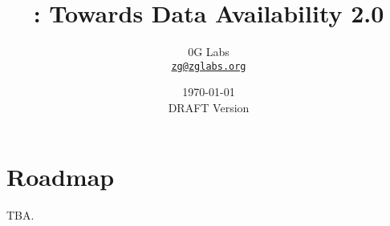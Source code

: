 \documentclass[letterpaper,11pt]{article}
\title{\LARGE \project:
	\Large Towards Data Availability 2.0}
\author{
		0G Labs\\
		\small\href{mailto:zg@zglabs.org}
			{\nolinkurl{zg@zglabs.org}}
	}
\date{\today\\\small DRAFT Version}
\begin{document}
\maketitle
\flushbottom %




\setcounter{tocdepth}{3}

\tableofcontents %

\thispagestyle{empty} %


\newpage













\section{Roadmap}

TBA.



\end{document}
